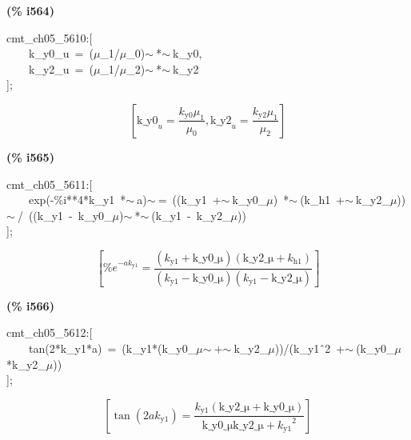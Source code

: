 \documentclass[fleqn]{article}
\begin{document}
\noindent
\begin{minipage}[t]{4.000000em}\color{red}\bfseries
(\% i564)	
\end{minipage}
\begin{minipage}[t]{\textwidth}\color{blue}
cmt\_ch05\_5610:[\\
\ \ \ \ k\_y0\_u\ =\ (\ensuremath{\mu}\_1/\ensuremath{\mu}\_0)\ensuremath{\sim\ }*\ensuremath{\sim\ }k\_y0,\\
\ \ \ \ k\_y2\_u\ =\ (\ensuremath{\mu}\_1/\ensuremath{\mu}\_2)\ensuremath{\sim\ }*\ensuremath{\sim\ }k\_y2\\
];
\end{minipage}
\[\displaystyle \tag{\% o564} 
\left[ {{\ensuremath{\mathrm{k\_ y0}}}_u}=\frac{{k_{\ensuremath{\mathrm{y0}}}} {{\mu }_1}}{{{\mu }_0}}\operatorname{,}{{\ensuremath{\mathrm{k\_ y2}}}_u}=\frac{{k_{\ensuremath{\mathrm{y2}}}} {{\mu }_1}}{{{\mu }_2}}\right] \mbox{}
\]


\noindent
\begin{minipage}[t]{4.000000em}\color{red}\bfseries
(\% i565)	
\end{minipage}
\begin{minipage}[t]{\textwidth}\color{blue}
cmt\_ch05\_5611:[\\
\ \ \ \ exp(-\%i**4*k\_y1\ *\ensuremath{\sim\ }a)\ensuremath{\sim\ }=\ ((k\_y1\ +\ensuremath{\sim\ }k\_y0\_\ensuremath{\mu})\ *\ensuremath{\sim\ }(k\_h1\ +\ensuremath{\sim\ }k\_y2\_\ensuremath{\mu}))\ensuremath{\sim\ }/\ ((k\_y1\ -\ k\_y0\_\ensuremath{\mu})\ensuremath{\sim\ }*\ensuremath{\sim\ }(k\_y1\ -\ k\_y2\_\ensuremath{\mu}))\\
];
\end{minipage}
\[\displaystyle \tag{\% o565} 
\left[ {{\% e}^{-a {k_{\ensuremath{\mathrm{y1}}}}}}=\frac{\left( {k_{\ensuremath{\mathrm{y1}}}}+\ensuremath{\mathrm{k\_ y0\_ \mu }}\right)  \left( \ensuremath{\mathrm{k\_ y2\_ \mu }}+{k_{\ensuremath{\mathrm{h1}}}}\right) }{\left( {k_{\ensuremath{\mathrm{y1}}}}-\ensuremath{\mathrm{k\_ y0\_ \mu }}\right)  \left( {k_{\ensuremath{\mathrm{y1}}}}-\ensuremath{\mathrm{k\_ y2\_ \mu }}\right) }\right] \mbox{}
\]


\noindent
\begin{minipage}[t]{4.000000em}\color{red}\bfseries
(\% i566)	
\end{minipage}
\begin{minipage}[t]{\textwidth}\color{blue}
cmt\_ch05\_5612:[\\
\ \ \ \ tan(2*k\_y1*a)\ =\ (k\_y1*(k\_y0\_\ensuremath{\mu}\ensuremath{\sim\ }+\ensuremath{\sim\ }k\_y2\_\ensuremath{\mu}))/(k\_y1\^\ 2\ +\ensuremath{\sim\ }(k\_y0\_\ensuremath{\mu}*k\_y2\_\ensuremath{\mu}))\\
];
\end{minipage}
\[\displaystyle \tag{\% o566} 
\left[ \tan{\left( 2 a {k_{\ensuremath{\mathrm{y1}}}}\right) }=\frac{{k_{\ensuremath{\mathrm{y1}}}} \left( \ensuremath{\mathrm{k\_ y2\_ \mu }}+\ensuremath{\mathrm{k\_ y0\_ \mu }}\right) }{\ensuremath{\mathrm{k\_ y0\_ \mu }} \ensuremath{\mathrm{k\_ y2\_ \mu }}+{{{k_{\ensuremath{\mathrm{y1}}}}}^{2}}}\right] \mbox{}
\]
\end{document}
